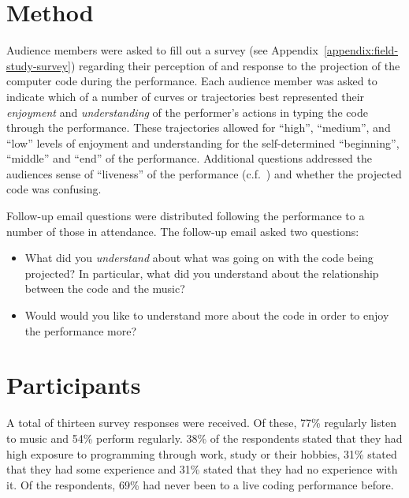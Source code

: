 \section{Method}

Audience members were asked to fill out a survey (see Appendix~\ref{appendix:field-study-survey}) regarding their perception of and response to the projection of the computer code during the performance. Each audience member was asked to indicate which of a number of curves or trajectories best represented their \emph{enjoyment} and \emph{understanding} of the performer's actions in typing the code through the performance. These trajectories allowed for ``high'', ``medium'', and ``low'' levels of enjoyment and understanding for the self-determined ``beginning'', ``middle'' and ``end'' of the performance. Additional questions addressed the audiences sense of ``liveness'' of the performance (c.f.~\cite{Auslander}) and whether the projected code was confusing.

Follow-up email questions were distributed following the performance to a number of those in attendance. The follow-up email asked two questions: 
\begin{itemize}
\item What did you \emph{understand} about what was going on with the code being projected? In particular, what did you understand about the relationship between the code and the music? 
\item Would would you like to understand more about the code in order to enjoy the performance more? 
\end{itemize}

\section{Participants}

A total of thirteen survey responses were received. Of these, 77\% regularly listen to music and 54\% perform regularly. 38\% of the respondents stated that they had high exposure to programming through work, study or their hobbies, 31\% stated that they had some experience and 31\% stated that they had no experience with it. Of the respondents, 69\% had never been to a live coding performance before.

